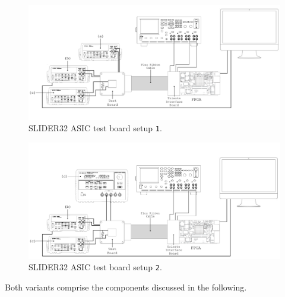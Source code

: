 \begin{figure}[h!]
    \centering
    \includegraphics[width=1\textwidth]{Images/chap1/test_setup_test_board_csavrefgm_auto.png}
    \caption{SLIDER32 ASIC test board setup \texttt{1}.}
    \label{figTESTBOARDsetup1}
\end{figure}

\begin{figure}[h!]
    \centering
    \includegraphics[width=1\textwidth]{Images/chap1/test_setup_test_board_csavrefgm_530mv.png}
    \caption{SLIDER32 ASIC test board setup \texttt{2}.}
    \label{figTESTBOARDsetup2}
\end{figure}

\par
\noindent
Both variants comprise the components discussed in the following.

